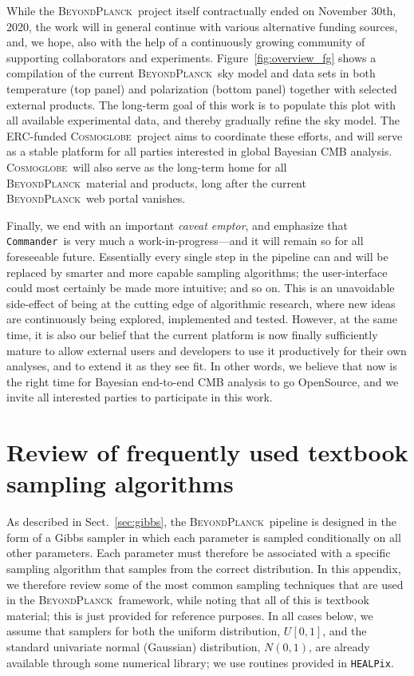 \documentclass[onecolumn]{aa}
\def\commander{\texttt{Commander}}
\newcommand{\BP}{\textsc{BeyondPlanck}}
\newcommand{\cosmoglobe}{\textsc{Cosmoglobe}}
\newcommand{\HEALPix}[0]{\texttt{HEALPix}}
\begin{document}
While the \BP\ project itself contractually ended on November 30th,
2020, the work will in general continue with various alternative
funding sources, and, we hope, also with the help of a continuously
growing community of supporting collaborators and
experiments. Figure~\ref{fig:overview_fg} shows a compilation of the
current \BP\ sky model and data sets in both temperature (top panel)
and polarization (bottom panel) together with selected external
products. The long-term goal of this work is to populate this plot
with all available experimental data, and thereby gradually refine the
sky model. The ERC-funded \cosmoglobe\ project aims to coordinate
these efforts, and will serve as a stable platform for all parties
interested in global Bayesian CMB analysis. \cosmoglobe\ will also
serve as the long-term home for all \BP\ material and products, long
after the current \BP\ web portal vanishes.

Finally, we end with an important \emph{caveat emptor}, and emphasize
that \commander\ is very much a work-in-progress---and it will
remain so for all foreseeable future. Essentially every single step in
the pipeline can and will be replaced by smarter and more capable
sampling algorithms; the user-interface could most certainly be made
more intuitive; and so on. This is an unavoidable side-effect of being
at the cutting edge of algorithmic research, where new ideas are
continuously being explored, implemented and tested. However, at the
same time, it is also our belief that the current platform is now
finally sufficiently mature to allow external users and developers to
use it productively for their own analyses, and to extend it as they
see fit. In other words, we believe that now is the right time for
Bayesian end-to-end CMB analysis to go OpenSource, and we invite all
interested parties to participate in this work.







\appendix

\section{Review of frequently used textbook sampling algorithms}
\label{app:samplers}

As described in Sect.~\ref{sec:gibbs}, the \BP\ pipeline is designed
in the form of a Gibbs sampler in which each parameter is sampled
conditionally on all other parameters. Each parameter must therefore
be associated with a specific sampling algorithm that samples from the
correct distribution. In this appendix, we therefore review some of
the most common sampling techniques that are used in the
\BP\ framework, while noting that all of this is textbook material;
this is just provided for reference purposes. In all cases below, we
assume that samplers for both the uniform distribution, $U[0,1]$, and
the standard univariate normal (Gaussian) distribution, $N(0,1)$, are
already available through some numerical library; we use routines
provided in \HEALPix.
\end{document}
